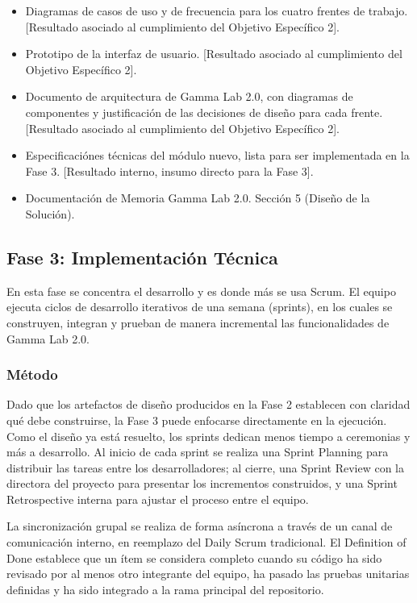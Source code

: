 \documentclass[12pt,letterpaper]{article}
\begin{document}
\begin{itemize}
  \item Diagramas de casos de uso y de frecuencia para los cuatro frentes de trabajo. [Resultado asociado al cumplimiento del Objetivo Específico 2].
  \item Prototipo  de la interfaz de usuario. [Resultado asociado al cumplimiento del Objetivo Específico 2].
  \item Documento de arquitectura de Gamma Lab 2.0, con diagramas de componentes y justificación de las decisiones de diseño para cada frente. [Resultado asociado al cumplimiento del Objetivo Específico 2].
  \item Especificaciónes técnicas del módulo nuevo, lista para ser implementada en la Fase 3. [Resultado interno, insumo directo para la Fase 3].
  \item Documentación de Memoria Gamma Lab 2.0. Sección 5 (Diseño de la Solución).
\end{itemize}

\subsection{Fase 3: Implementación Técnica}

En esta fase se concentra el desarrollo y es donde más se usa Scrum. El equipo ejecuta ciclos de desarrollo iterativos de una semana (sprints), en los cuales se construyen, integran y prueban de manera incremental las funcionalidades de Gamma Lab 2.0.

\subsubsection{Método}
Dado que los artefactos de diseño producidos en la Fase 2 establecen con claridad qué debe construirse, la Fase 3 puede enfocarse directamente en la ejecución. Como el diseño ya está resuelto, los sprints dedican menos tiempo a ceremonias y más a desarrollo. Al inicio de cada sprint se realiza una Sprint Planning para distribuir las tareas entre los desarrolladores; al cierre, una Sprint Review con la directora del proyecto para presentar los incrementos construidos, y una Sprint Retrospective interna para ajustar el proceso entre el equipo. 

La sincronización grupal se realiza de forma asíncrona a través de un canal de comunicación interno, en reemplazo del Daily Scrum tradicional. El Definition of Done establece que un ítem se considera completo cuando su código ha sido revisado por al menos otro integrante del equipo, ha pasado las pruebas unitarias definidas y ha sido integrado a la rama principal del repositorio.
\end{document}
